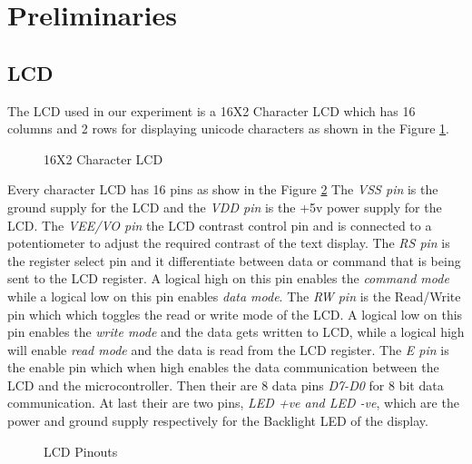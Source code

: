 \documentclass{article}
\begin{document}
\section{Preliminaries}
\subsection{LCD}
The LCD used in our experiment is a 16X2 Character LCD which has 16 columns and 2 rows for displaying unicode characters as shown in the Figure \ref{fig:16X2 Character LCD}. 
\begin{figure}[H]
    \centering
    \caption{16X2 Character LCD}
    \label{fig:16X2 Character LCD}
\end{figure}


Every character LCD has 16 pins as show in the Figure \ref{fig:LCD pin out} The \emph{VSS pin} is the ground supply for the LCD and the \emph{VDD pin} is the +5v power supply for the LCD. The \emph{VEE/VO pin} the LCD contrast control pin and is connected to a potentiometer to adjust the required contrast of the text display. The \emph{RS pin} is the register select pin and it differentiate between data or command that is being sent to the LCD register. A logical high on this pin enables the \emph{command mode} while a logical low on this pin enables \emph{data mode}. The \emph{RW pin} is the Read/Write pin which which toggles the read or write mode of the LCD. A logical low on this pin enables the \emph{write mode} and the data gets written to LCD, while a logical high will enable \emph{read mode} and the data is read from the LCD register. The \emph{E pin} is the enable pin which when high enables the data communication between the LCD and the microcontroller. Then their are 8 data pins \emph{D7-D0} for 8 bit data communication. At last their are two pins, \emph{LED +ve and LED -ve}, which are the power and ground supply respectively for the Backlight LED of the display.

\begin{figure}[H]
    \centering
    \caption{LCD Pinouts}
    \label{fig:LCD pin out}
\end{figure}
\end{document}
